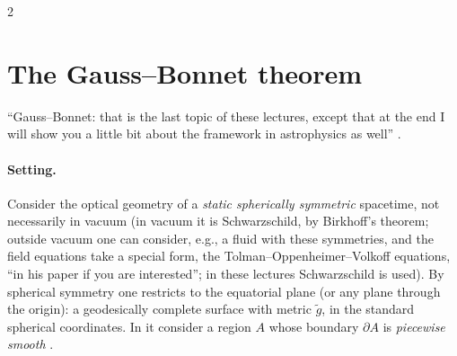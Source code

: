 \begin{paracol}{2}
\section{The Gauss--Bonnet theorem}\label{sec:c17-gb}

``Gauss--Bonnet: that is the last topic of these lectures, except that at the end I will show you a little bit about the framework in astrophysics as well'' .

\paragraph{Setting.} Consider the optical geometry of a \emph{static spherically symmetric} spacetime, not necessarily in vacuum (in vacuum it is Schwarzschild, by Birkhoff's theorem; outside vacuum one can consider, e.g., a fluid with these symmetries, and the field equations take a special form, the Tolman--Oppenheimer--Volkoff equations, ``in his paper if you are interested''; in these lectures Schwarzschild is used). By spherical symmetry one restricts to the equatorial plane (or any plane through the origin): a geodesically complete surface with metric $\tilde g$, in the standard spherical coordinates. In it consider a region $A$ whose boundary $\partial A$ is \emph{piecewise smooth} .


\end{paracol}
